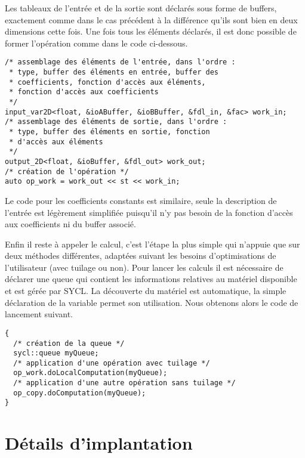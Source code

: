 Les tableaux de l'entrée et de la sortie sont déclarés sous forme de buffers, exactement comme dans le cas précédent à la différence qu'ils sont bien en deux dimensions cette fois. Une fois tous les éléments déclarés, il est donc possible de former l'opération comme dans le code ci-dessous.
\begin{verbatim}
/* assemblage des éléments de l'entrée, dans l'ordre :
 * type, buffer des éléments en entrée, buffer des 
 * coefficients, fonction d'accès aux éléments,
 * fonction d'accès aux coefficients
 */
input_var2D<float, &ioABuffer, &ioBBuffer, &fdl_in, &fac> work_in;
/* assemblage des éléments de sortie, dans l'ordre :
 * type, buffer des éléments en sortie, fonction
 * d'accès aux éléments
 */
output_2D<float, &ioBuffer, &fdl_out> work_out;
/* création de l'opération */
auto op_work = work_out << st << work_in;
\end{verbatim}
Le code pour les coefficients constants est similaire, seule la description de l'entrée est légèrement simplifiée puisqu'il n'y pas besoin de la fonction d'accès aux coefficients ni du buffer associé. 

Enfin il reste à appeler le calcul, c'est l'étape la plus simple qui n'appuie que sur deux méthodes différentes, adaptées suivant les besoins d'optimisations de l'utilisateur (avec tuilage ou non). Pour lancer les calculs il est nécessaire de déclarer une queue qui contient les informations relatives au matériel disponible et est gérée par \textsf{SYCL}. La découverte du matériel est automatique, la simple déclaration de la variable permet son utilisation. Nous obtenons alors le code de lancement suivant.
\begin{verbatim}
{   
  /* création de la queue */
  sycl::queue myQueue; 
  /* application d'une opération avec tuilage */
  op_work.doLocalComputation(myQueue);
  /* application d'une autre opération sans tuilage */
  op_copy.doComputation(myQueue);
}
\end{verbatim}

\section{Détails d'implantation}

